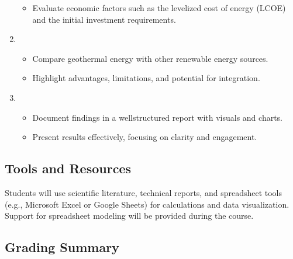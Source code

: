 \documentclass[letterpaper,10pt,english]{jupyterBook}
\begin{document}
\begin{enumerate}
\begin{itemize}
\item {} 
\sphinxAtStartPar
Evaluate economic factors such as the levelized cost of energy (LCOE) and the initial investment requirements.

\end{itemize}

\item {} 
\sphinxAtStartPar
{}
\begin{itemize}
\item {} 
\sphinxAtStartPar
Compare geothermal energy with other renewable energy sources.

\item {} 
\sphinxAtStartPar
Highlight advantages, limitations, and potential for integration.

\end{itemize}

\item {} 
\sphinxAtStartPar
{}
\begin{itemize}
\item {} 
\sphinxAtStartPar
Document findings in a well\sphinxhyphen{}structured report with visuals and charts.

\item {} 
\sphinxAtStartPar
Present results effectively, focusing on clarity and engagement.

\end{itemize}

\end{enumerate}


\subsection{Tools and Resources}
\label{\detokenize{ProjectInstructions:id38}}
\sphinxAtStartPar
Students will use scientific literature, technical reports, and spreadsheet tools (e.g., Microsoft Excel or Google Sheets) for calculations and data visualization. Support for spreadsheet modeling will be provided during the course.


\subsection{Grading Summary}
\label{\detokenize{ProjectInstructions:id39}}
\end{document}
